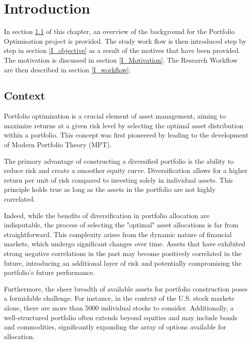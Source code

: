 \newpage
\setcounter{page}{1}
\chapter{Introduction}
\label{introchap}

In section \ref{I_context} of this chapter, an overview of the background for the Portfolio Optimisation project is provided. The study work flow is then introduced step by step in section \ref{I_objective} as a result of the motives that have been provided. The motivation is discussed in section \ref{I_Motivation}. The Research Workflow are then described in section \ref{I_workflow}.

\section{Context}\label{I_context}
Portfolio optimization is a crucial element of asset management, aiming to maximize returns at a given risk level by selecting the optimal asset distribution within a portfolio. This concept was first pioneered by 
 leading to the development of Modern Portfolio Theory (MPT).

The primary advantage of constructing a diversified portfolio is the ability to reduce risk and create a smoother equity curve. Diversification allows for a higher return per unit of risk compared to investing solely in individual assets. This principle holds true as long as the assets in the portfolio are not highly correlated.

Indeed, while the benefits of diversification in portfolio allocation are indisputable, the process of selecting the "optimal" asset allocations is far from straightforward. This complexity arises from the dynamic nature of financial markets, which undergo significant changes over time. Assets that have exhibited strong negative correlations in the past may become positively correlated in the future, introducing an additional layer of risk and potentially compromising the portfolio's future performance.

Furthermore, the sheer breadth of available assets for portfolio construction poses a formidable challenge. For instance, in the context of the U.S. stock markets alone, there are more than 5000 individual stocks to consider. Additionally, a well-structured portfolio often extends beyond equities and may include bonds and commodities, significantly expanding the array of options available for allocation.

